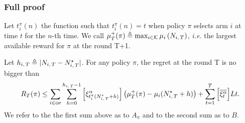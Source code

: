 \subsubsection*{Full proof}
\label{ss:rested-proof}
Let $t_i^\pi(n)$ the function such that $t_i^\pi(n) = t$ when policy $\pi$ selects arm $i$ at time $t$ for the $n$-th time. We call $\mu_T^+(\pi) \triangleq \max_{i \in \mathcal{K}} \mu_i\left(N_{i,\,T}\right)$, \textit{i.e.} the largest available reward for $\pi$ at the round T+1.  
\begin{lemma}
\label{lem:regret-decompo}
 Let $h_{i,\,T} \triangleq | N_{i,\,T} - N_{i,\,T}^{\star}|$. For any policy $\pi$, the regret at the round T is no bigger than
\begin{equation*}
R_T(\pi) \leq \sum_{i \in \textsc{op}} \sum_{h=0}^{h_{i,\,T}-1}\left[\xi^\alpha_{t_i^\pi(N_{i,\,T}^\star + h)} \right]\left(\mu^+_T(\pi) - \mu_i(N_{i,\,T}^{\star} + h ) \right) + \sum_{t=1}^T \Big[\overline{\xi^\alpha_t}\Big]Lt.
\end{equation*}
We refer to the the first sum above as to $A_\pi$ and to the second sum as to $B$.
\end{lemma}
